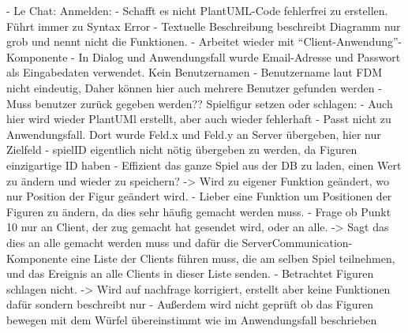 - Le Chat:
    Anmelden:
        - Schafft es nicht PlantUML-Code fehlerfrei zu erstellen. Führt immer zu Syntax Error
        - Textuelle Beschreibung beschreibt Diagramm nur grob und nennt nicht die Funktionen. 
        - Arbeitet wieder mit ``Client-Anwendung''-Komponente
        - In Dialog und Anwendungsfall wurde Email-Adresse und Passwort als Eingabedaten verwendet. Kein Benutzernamen
        - Benutzername laut FDM nicht eindeutig, Daher können hier auch mehrere Benutzer gefunden werden
        - Muss benutzer zurück gegeben werden??
    Spielfigur setzen oder schlagen:
        - Auch hier wird wieder PlantUMl erstellt, aber auch wieder fehlerhaft
        - Passt nicht zu Anwendungsfall. Dort wurde Feld.x und Feld.y an Server übergeben, hier nur Zielfeld
        - spielID eigentlich nicht nötig übergeben zu werden, da Figuren einzigartige ID haben
        - Effizient das ganze Spiel aus der DB zu laden, einen Wert zu ändern und wieder zu speichern? -> Wird zu eigener Funktion geändert, wo
        nur Position der Figur geändert wird.
        - Lieber eine Funktion um Positionen der Figuren zu ändern, da dies sehr häufig gemacht werden muss.
        - Frage ob Punkt 10 nur an Client, der zug gemacht hat gesendet wird, oder an alle. -> Sagt das dies 
        an alle gemacht werden muss und dafür die ServerCommunication-Komponente eine Liste der Clients führen muss, 
        die am selben Spiel teilnehmen, und das Ereignis an alle Clients in dieser Liste senden.
        - Betrachtet Figuren schlagen nicht. -> Wird auf nachfrage korrigiert, erstellt aber keine Funktionen dafür sondern beschreibt nur
        - Außerdem wird nicht geprüft ob das Figuren bewegen mit dem Würfel übereinstimmt wie im Anwendungsfall beschrieben



